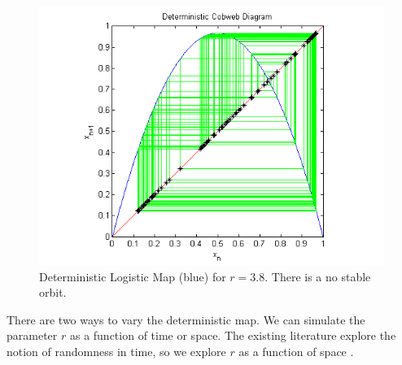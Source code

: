 \documentclass[12pt]{article}
\begin{document}
\begin{figure}[H]
	\begin{center}
		\includegraphics[scale=0.7]{chaos}
\caption{Deterministic Logistic Map (blue) for $r=3.8$. There is a no stable orbit.}
	\end{center}
\end{figure}
There are two ways to vary the deterministic map. We can simulate the
parameter $r$ as a function of time or space. The existing literature
explore the notion of randomness in time, so we explore $r$ as a
function of space \cite{athreya}.
\end{document}
